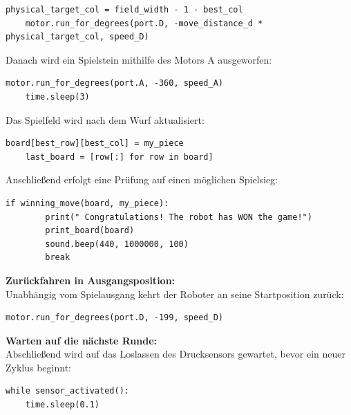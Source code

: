 \begin{lstlisting}[style=pythonstyle]
	physical_target_col = field_width - 1 - best_col
	motor.run_for_degrees(port.D, -move_distance_d * physical_target_col, speed_D)
\end{lstlisting}

Danach wird ein Spielstein mithilfe des Motors A ausgeworfen:

\begin{lstlisting}[style=pythonstyle]
	motor.run_for_degrees(port.A, -360, speed_A)
	time.sleep(3)
\end{lstlisting}

Das Spielfeld wird nach dem Wurf aktualisiert:

\begin{lstlisting}[style=pythonstyle]
	board[best_row][best_col] = my_piece
	last_board = [row[:] for row in board]
\end{lstlisting}

Anschließend erfolgt eine Prüfung auf einen möglichen Spielsieg:

\begin{lstlisting}[style=pythonstyle]
	if winning_move(board, my_piece):
		print(" Congratulations! The robot has WON the game!")
		print_board(board)
		sound.beep(440, 1000000, 100)
		break
\end{lstlisting}

\textbf{Zurückfahren in Ausgangsposition:}\\

Unabhängig vom Spielausgang kehrt der Roboter an seine Startposition zurück:

\begin{lstlisting}[style=pythonstyle]
	motor.run_for_degrees(port.D, -199, speed_D)
\end{lstlisting}

\textbf{Warten auf die nächste Runde:}\\
Abschließend wird auf das Loslassen des Drucksensors gewartet, bevor ein neuer Zyklus beginnt:

\begin{lstlisting}[style=pythonstyle]
	while sensor_activated():
	time.sleep(0.1)
\end{lstlisting}



